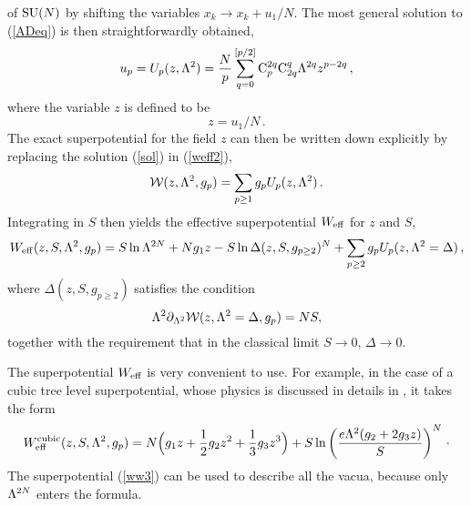 \documentclass[a4paper,12pt]{article}
\def\suN{{\rm SU}(N)}
\def\C{{\rm C}}\def\F{{\cal F}}
\begin{document}
of $\suN$ by shifting the variables $x_{k}\rightarrow x_{k} +u_{1}/N$.
The most general solution to (\ref{ADeq}) is then straightforwardly 
obtained,
%
\begin{equation}
\label{sol}
u_{p} = U_{p}(z,\L^{2})= {N\over p}\sum_{q=0}^{[p/2]}\C_{p}^{2q}
\C_{2q}^{q} \L^{2q} z^{p-2q}\, ,
\end{equation}
%
where the variable $z$ is defined to be
%
\begin{equation}
\label{zdef}
z = u_{1}/N\, .
\end{equation}
%
The exact superpotential for the field $z$
can then be written down explicitly by replacing the solution 
(\ref{sol}) in (\ref{weff2}),
%
\begin{equation}
\label{Weffz}
{\cal W} (z,\Lambda^{2},g_{p}) = \sum_{p\geq 1} g_{p} U_{p}(z,\Lambda^{2})\, .
\end{equation}
%
Integrating in $S$ then yields the effective superpotential $W_{\rm eff}$ 
for $z$ and $S$,
%
\begin{equation}
\label{ww}
W_{\rm eff} (z,S,\Lambda^{2},g_{p}) =S\ln\Lambda^{2N}+Ng_{1}z - S\ln \Delta (z,S,g_{p\geq 
2})^{N} + \sum_{p\geq 2} g_{p} U_{p}(z,\Lambda^{2}=\Delta)\, ,
\end{equation}
%
where $\Delta (z,S,g_{p\geq 2})$ satisfies the condition
%
\begin{equation}
\label{Bc}
\Lambda^{2}\partial_{\Lambda^{2}}{\cal W} (z,\Lambda^{2}=\Delta ,g_{p}) =N S,
\end{equation}
%
together with the requirement that in the classical limit 
$S\rightarrow 0$, $\Delta\rightarrow 0$.

The superpotential $W_{\rm eff}$ is very 
convenient to use. For example, in the case of a cubic tree level
superpotential, whose physics is discussed in details in \cite{fer},
it takes the form
%
\begin{equation}
\label{ww3}
W_{\rm eff}^{\rm cubic}
(z,S,\Lambda^{2},g_{p}) = N\Bigl( g_{1}z + {1\over 2}g_{2}z^{2} + {1\over 3} 
g_{3}z^{3}\Bigr) + S\ln \left({e\Lambda^{2} (g_{2}+2g_{3}z)\over 
S}\right)^{N}\,\cdotp
\end{equation}
%
The superpotential (\ref{ww3}) can be used to 
describe all the vacua, because only $\Lambda^{2N}$ enters the formula.
\end{document}
